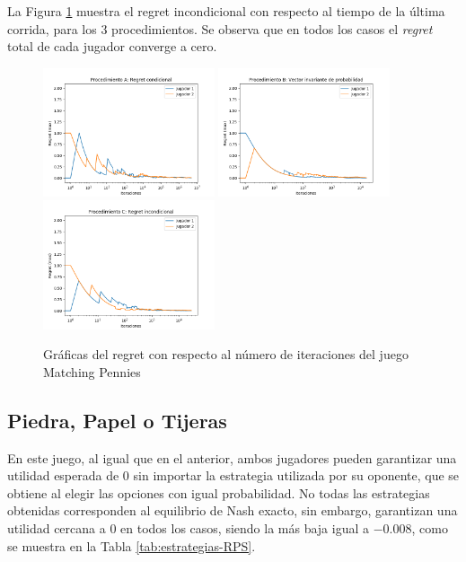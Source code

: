 La Figura \ref{fig:regret-matching-pennies} muestra el regret incondicional con respecto al tiempo de la última corrida, para los $3$ procedimientos. Se observa que en todos los casos el \textit{regret} total de cada jugador converge a cero.

\begin{figure}[hbt!]
\caption{Gráficas del regret con respecto al número de iteraciones del juego Matching Pennies}
\label{fig:regret-matching-pennies}
\centering
\includegraphics[width=0.45\textwidth]{graficas/matching-pennies/procedimiento-A.png}
\includegraphics[width=0.45\textwidth]{graficas/matching-pennies/procedimiento-B.png}
\includegraphics[width=0.45\textwidth]{graficas/matching-pennies/procedimiento-C.png}
\end{figure}

\subsection{Piedra, Papel o Tijeras}

En este juego, al igual que en el anterior, ambos jugadores pueden garantizar una utilidad esperada de $0$ sin importar la estrategia utilizada por su oponente, que se obtiene al elegir las opciones con igual probabilidad. No todas las estrategias obtenidas corresponden al equilibrio de Nash exacto, sin embargo, garantizan una utilidad cercana a $0$ en todos los casos, siendo la más baja igual a $-0.008$, como se muestra en la Tabla \ref{tab:estrategias-RPS}.

